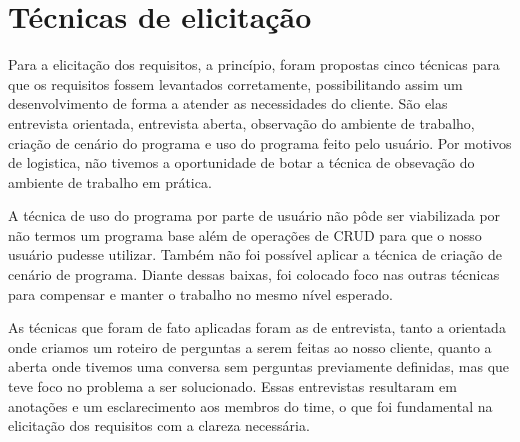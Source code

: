\chapter{Técnicas de elicitação}

Para a elicitação dos requisitos, a princípio, foram propostas cinco técnicas para que os requisitos fossem levantados corretamente, possibilitando assim um desenvolvimento de forma a atender as necessidades do cliente. São elas entrevista orientada, entrevista aberta, observação do ambiente de trabalho, criação de cenário do programa e uso do programa feito pelo usuário.
Por motivos de logistica, não tivemos a oportunidade de botar a técnica de obsevação do ambiente de trabalho em prática. 

A técnica de uso do programa por parte de usuário não pôde ser viabilizada por não termos um programa base além de operações de CRUD para que o nosso usuário pudesse utilizar. Também não foi possível aplicar a técnica de criação de cenário de programa. Diante dessas baixas, foi colocado foco nas outras técnicas para compensar e manter o trabalho no mesmo nível esperado.

As técnicas que foram de fato aplicadas foram as de entrevista, tanto a orientada onde criamos um roteiro de perguntas a serem feitas ao nosso cliente, quanto a aberta onde tivemos uma conversa sem perguntas previamente definidas, mas que teve foco no problema a ser solucionado. Essas entrevistas resultaram em anotações e um esclarecimento aos membros do time, o que foi fundamental na elicitação dos requisitos com a clareza necessária.